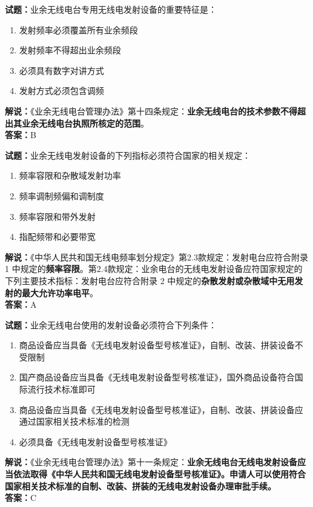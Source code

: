 \documentclass{ctexbook}
\begin{document}
\bigskip


\noindent\textbf{试题：}业余无线电台专用无线电发射设备的重要特征是：
\begin{enumerate}[leftmargin=3em]
	\item 发射频率必须覆盖所有业余频段
	\item 发射频率不得超出业余频段
	\item 必须具有数字对讲方式
	\item 发射方式必须包含调频
\end{enumerate}
\noindent\textbf{解说：}《业余无线电台管理办法》第十四条规定：\textbf{业余无线电台的技术参数不得超出其业余无线电台执照所核定的范围}。\\\noindent\textbf{答案：}B%



\bigskip


\noindent\textbf{试题：}业余无线电发射设备的下列指标必须符合国家的相关规定：
\begin{enumerate}[leftmargin=3em]
	\item 频率容限和杂散域发射功率
	\item 频率调制频偏和调制度
	\item 频率容限和带外发射
	\item 指配频带和必要带宽
\end{enumerate}
\noindent\textbf{解说：}《中华人民共和国无线电频率划分规定》第2.3款规定：发射电台应符合附录 1 中规定的\textbf{频率容限}。第2.4款规定：业余电台的无线电发射设备应符国家规定的下列主要技术指标：发射电台应符合附录 2 中规定的\textbf{杂散发射或杂散域中无用发射的最大允许功率电平}。\\\noindent\textbf{答案：}A



\bigskip


\noindent\textbf{试题：}业余无线电台使用的发射设备必须符合下列条件：
\begin{enumerate}[leftmargin=3em]
	\item 商品设备应当具备《无线电发射设备型号核准证》，自制、改装、拼装设备不受限制
	\item 国产商品设备应当具备《无线电发射设备型号核准证》，国外商品设备符合国际流行技术标准即可
	\item 商品设备应当具备《无线电发射设备型号核准证》，自制、改装、拼装设备应通过国家相关技术标准的检测
	\item 必须具备《无线电发射设备型号核准证》
\end{enumerate}
\noindent\textbf{解说：}《业余无线电台管理办法》第十一条规定：\textbf{业余无线电台无线电发射设备应当依法取得《中华人民共和国无线电发射设备型号核准证》。申请人可以使用符合国家相关技术标准的自制、改装、拼装的无线电发射设备办理审批手续。}\\\noindent\textbf{答案：}C
\end{document}
